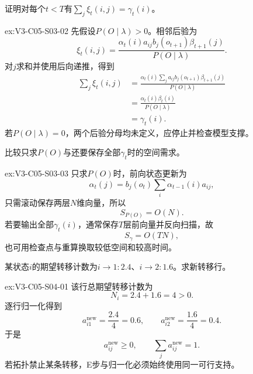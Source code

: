 \begin{SLChapterExercisePairSection}
\begin{exercise}\label{ex:V3-C05-S03-02}
证明对每个$t<T$有$\sum_j\xi_t(i,j)=\gamma_t(i)$。
\end{exercise}
\ifSLFullEdition
{}\label{sol:V3-C05-S03-02}
\begin{chapterexercisesolution}{ex:V3-C05-S03-02}
先假设$P(O\mid\lambda)>0$。相邻后验为
\[
\xi_t(i,j)=\frac{\alpha_t(i)a_{ij}b_j(o_{t+1})\beta_{t+1}(j)}{P(O\mid\lambda)}.
\]
对$j$求和并使用后向递推，得到
\[
\begin{aligned}
\sum_j\xi_t(i,j)
&=\frac{\alpha_t(i)\sum_ja_{ij}b_j(o_{t+1})\beta_{t+1}(j)}{P(O\mid\lambda)}\\
&=\frac{\alpha_t(i)\beta_t(i)}{P(O\mid\lambda)}\\
&=\gamma_t(i).
\end{aligned}
\]
若$P(O\mid\lambda)=0$，两个后验分母均未定义，应停止并检查模型支撑。
\end{chapterexercisesolution}
\fi

\begin{exercise}\label{ex:V3-C05-S03-03}
比较只求$P(O)$与还要保存全部$\gamma_t$时的空间需求。
\end{exercise}
\ifSLFullEdition
{}\label{sol:V3-C05-S03-03}
\begin{chapterexercisesolution}{ex:V3-C05-S03-03}
只求$P(O)$时，前向状态更新为
\[
\alpha_t(j)=b_j(o_t)\sum_i\alpha_{t-1}(i)a_{ij},
\]
只需滚动保存两层$N$维向量，所以
\[
S_{P(O)}=O(N).
\]
若要输出全部$\gamma_t(i)$，通常保存$T$层前向量并反向扫描，故
\[
S_{\gamma}=O(TN),
\]
也可用检查点与重算换取较低空间和较高时间。
\end{chapterexercisesolution}
\fi

\begin{exercise}\label{ex:V3-C05-S04-01}
某状态$i$的期望转移计数为$i\to1:2.4$、$i\to2:1.6$。求新转移行。
\end{exercise}
\ifSLFullEdition
{}\label{sol:V3-C05-S04-01}
\begin{chapterexercisesolution}{ex:V3-C05-S04-01}
该行总期望转移计数为
\[
N_i=2.4+1.6=4>0.
\]
逐行归一化得到
\[
a_{i1}^{\mathrm{new}}=\frac{2.4}{4}=0.6,
\qquad
a_{i2}^{\mathrm{new}}=\frac{1.6}{4}=0.4.
\]
于是
\[
a_{ij}^{\mathrm{new}}\geq0,
\qquad
\sum_ja_{ij}^{\mathrm{new}}=1.
\]
若拓扑禁止某条转移，E步与归一化必须始终使用同一可行支持。
\end{chapterexercisesolution}
\fi


\end{SLChapterExercisePairSection}
